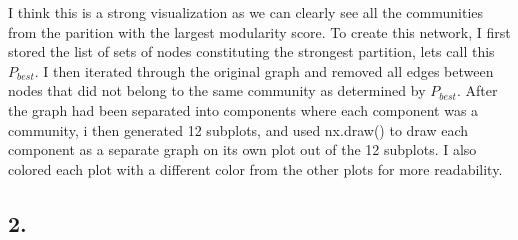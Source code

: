 \documentclass{article}
\begin{document}
\begin{enumerate}[label=(\alph*), left=10pt, itemsep=10pt]
\begin{minipage}[t]{0.9\textwidth}
            I think this is a strong visualization as we can clearly see all the communities from
            the parition with the largest modularity score. To create this network, I first stored
            the list of sets of nodes constituting the strongest partition, lets call this
            $P_{best}$. I then iterated through the original graph and removed all edges between
            nodes that did not belong to the same community as determined by $P_{best}$. After
            the graph had been separated into components where each component was a community,
            i then generated 12 subplots, and used nx.draw() to draw each component as a separate
            graph on its own plot out of the 12 subplots. I also colored each plot with a different
            color from the other plots for more readability.
        \end{minipage}

    \end{enumerate}

    \subsection*{2.}
\end{document}

